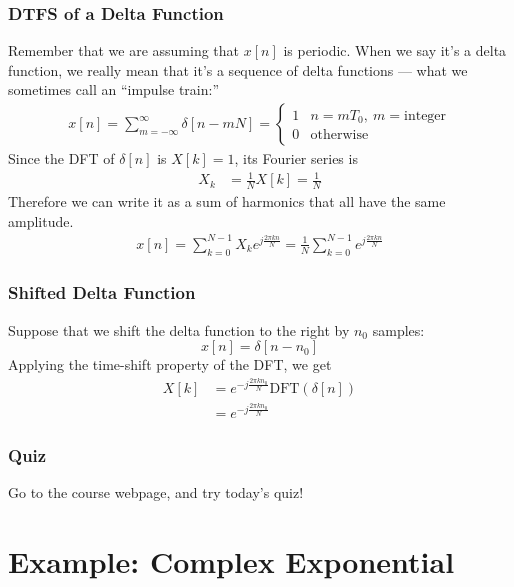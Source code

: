 \documentclass{beamer}
\begin{document}
\begin{frame}
  \frametitle{DTFS of a Delta Function}

  Remember that we are assuming that $x[n]$ is periodic.  When we say
  it's a delta function, we really mean that it's a sequence of delta
  functions --- what we sometimes call an ``impulse train:''
  \begin{align*}
    x[n] = \sum_{m=-\infty}^\infty \delta[n-mN] =
    \begin{cases}1 & n=mT_0,~m=\text{integer}\\0&\text{otherwise}\end{cases}
  \end{align*} 
  Since the DFT of $\delta[n]$ is $X[k]=1$, its Fourier series is
  \begin{align*}
    X_k &= \frac{1}{N}X[k]= \frac{1}{N}
  \end{align*}
  Therefore we can write it as a sum of harmonics that all have the same amplitude.
  \begin{align*}
    x[n] = \sum_{k=0}^{N-1}X_k e^{j\frac{2\pi kn}{N}}=
    \frac{1}{N}\sum_{k=0}^{N-1} e^{j\frac{2\pi kn}{N}}
  \end{align*} 
\end{frame}

\begin{frame}
  \frametitle{Shifted Delta Function}

  Suppose that we shift the delta function to the right by $n_0$
  samples:
  \begin{displaymath}
    x[n]=\delta[n-n_0]
  \end{displaymath}
  Applying the time-shift property of the DFT, we get
  \begin{align*}
    X[k] &= e^{-j\frac{2\pi kn_0}{N}}\text{DFT}\left(\delta[n]\right)\\
    &= e^{-j\frac{2\pi kn_0}{N}}
  \end{align*}
\end{frame}

\begin{frame}
  \frametitle{Quiz}

  Go to the course webpage, and try today's quiz!
\end{frame}

\section[Exponential]{Example: Complex Exponential}
\setcounter{subsection}{1}
\end{document}
